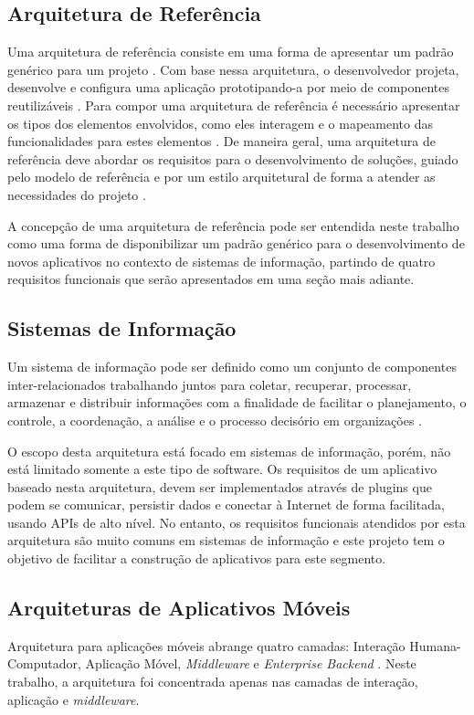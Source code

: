 \subsection{Arquitetura de Referência} %
Uma arquitetura de referência consiste em uma forma de apresentar um padrão genérico para um projeto \cite{zambiasi}. Com base nessa arquitetura, o desenvolvedor projeta, desenvolve e configura uma aplicação prototipando-a por meio de componentes reutilizáveis \cite{zambiasi}. Para compor uma arquitetura de referência é necessário apresentar os tipos dos elementos envolvidos, como eles interagem e o mapeamento das funcionalidades para estes elementos \cite{Hofmeister:1999:ASA:322640}. De maneira geral, uma arquitetura de referência deve abordar os requisitos para o desenvolvimento de soluções, guiado pelo modelo de referência e por um estilo arquitetural de forma a atender as necessidades do projeto \cite{c._k_f._2006}.\par

A concepção de uma arquitetura de referência pode ser entendida neste trabalho como uma forma de disponibilizar um padrão genérico para o desenvolvimento de novos aplicativos no contexto de sistemas de informação, partindo de quatro requisitos funcionais que serão apresentados em uma seção mais adiante.\par


\subsection{Sistemas de Informação} %
Um sistema de informação pode ser definido como um conjunto de componentes inter-relacionados trabalhando juntos para coletar, recuperar, processar, armazenar e distribuir informações com a finalidade de facilitar o planejamento, o controle, a coordenação, a análise e o processo decisório em organizações \cite{laudon}.\par
O escopo desta arquitetura está focado em sistemas de informação, porém, não está limitado somente a este tipo de software. Os requisitos de um aplicativo baseado nesta arquitetura, devem ser implementados através de plugins que podem se comunicar, persistir dados e conectar à Internet de forma facilitada, usando APIs de alto nível. No entanto, os requisitos funcionais atendidos por esta arquitetura são muito comuns em sistemas de informação e este projeto tem o objetivo de facilitar a construção de aplicativos para este segmento.


\subsection{Arquiteturas de Aplicativos Móveis} %
Arquitetura para aplicações móveis abrange quatro camadas: Interação Humana-Computador, Aplicação Móvel, \textit{Middleware} e \textit{Enterprise Backend} \cite{Pabllo:2008:MMA:1621087.1621128}. Neste trabalho, a arquitetura foi concentrada apenas nas camadas de interação, aplicação e \textit{middleware}.

